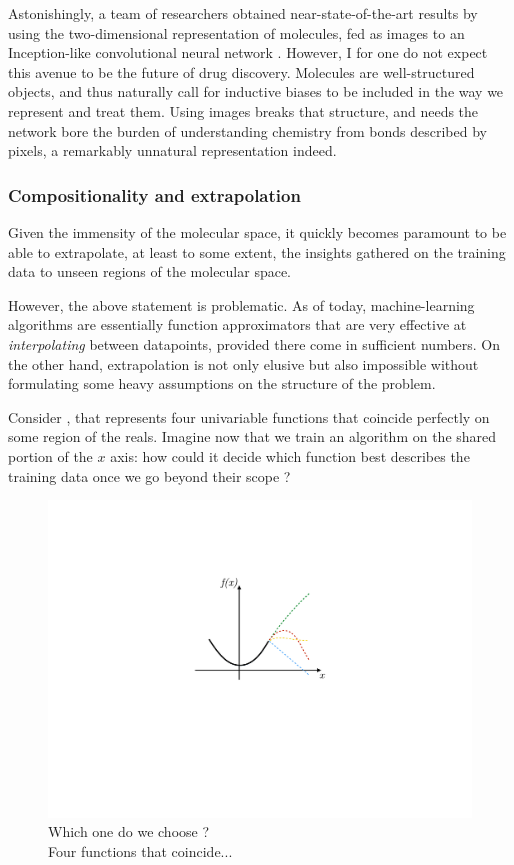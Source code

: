 \documentclass[11pt]{article}
\numberwithin{equation}{subsection}
\begin{document}
Astonishingly, a team of researchers obtained near-state-of-the-art results by using the two-dimensional representation of molecules, fed as images to an Inception-like convolutional neural network \citep{goh2017chemception}. However, I for one do not expect this avenue to be the future of drug discovery. Molecules are well-structured objects, and thus naturally call for inductive biases to be included in the way we represent and treat them. Using images breaks that structure, and needs the network bore the burden of understanding chemistry from bonds described by pixels, a remarkably unnatural representation indeed.


\subsubsection{Compositionality and extrapolation}

Given the immensity of the molecular space, it quickly becomes paramount to be able to extrapolate, at least to some extent, the insights gathered on the training data to unseen regions of the molecular space.

However, the above statement is problematic. As of today, machine-learning algorithms are essentially function approximators that are very effective at \textit{interpolating} between datapoints, provided there come in sufficient numbers. On the other hand, extrapolation is not only elusive but also impossible without formulating some heavy assumptions on the structure of the problem.

Consider , that represents four univariable functions that coincide perfectly on some region of the reals. Imagine now that we train an algorithm on the shared portion of the $x$ axis: how could it decide which function best describes the training data once we go beyond their scope ?

\begin{figure}[ht]
  \includegraphics[width=.4\textwidth,center]{extrapolation}
  \caption{Which one do we choose ?\\Four functions that coincide...}
  \label{fig:extrapolation}
\end{figure}
\end{document}

